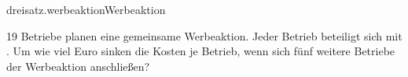 \begin{exercise}{dreisatz.werbeaktion}{Werbeaktion}
  \ifproblem\problem\par
    19 Betriebe planen eine gemeinsame Werbeaktion. Jeder Betrieb beteiligt sich
    mit . Um wie viel Euro sinken die Kosten je Betrieb, wenn
    sich fünf weitere Betriebe der Werbeaktion anschließen?
  \fi
\end{exercise}
